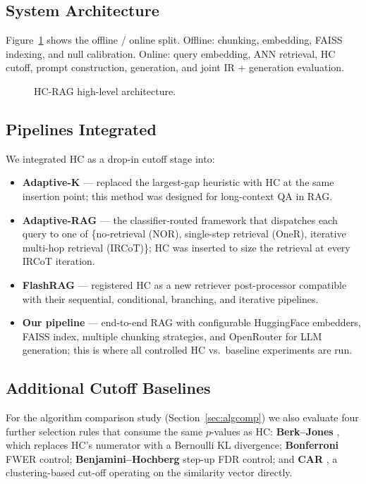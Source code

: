 \documentclass[letterpaper]{article}
\begin{document}
\subsection{System Architecture}
Figure~\ref{fig:arch} shows the offline / online split. Offline:
chunking, embedding, FAISS indexing, and null calibration. Online:
query embedding, ANN retrieval, HC cutoff, prompt construction,
generation, and joint IR + generation evaluation.

\begin{figure}[t]
\centering
\caption{HC-RAG high-level architecture.}
\label{fig:arch}
\end{figure}

\subsection{Pipelines Integrated}
We integrated HC as a drop-in cutoff stage into:
\begin{itemize}
\item \textbf{Adaptive-K} \cite{adaptivek2025} --- replaced the
largest-gap heuristic with HC at the same insertion point;
this method was designed for long-context QA in RAG.
\item \textbf{Adaptive-RAG} \cite{jeong2024adaptiverag} --- the
classifier-routed framework that dispatches each query to one of
\{no-retrieval (NOR), single-step retrieval (OneR), iterative
multi-hop retrieval (IRCoT)\}; HC was inserted to size the
retrieval at every IRCoT iteration.
\item \textbf{FlashRAG} \cite{jin2025flashrag} --- registered HC as a
new retriever post-processor compatible with their sequential,
conditional, branching, and iterative pipelines.
\item \textbf{Our pipeline} --- end-to-end RAG with configurable
HuggingFace embedders, FAISS index, multiple chunking strategies, and
OpenRouter for LLM generation; this is where all controlled HC vs.\
baseline experiments are run.
\end{itemize}

\subsection{Additional Cutoff Baselines}
For the algorithm comparison study (Section~\ref{sec:algcomp}) we
also evaluate four further selection rules that consume the same
$p$-values as HC: \textbf{Berk--Jones} \cite{berkjones1979}, which
replaces HC's numerator with a Bernoulli KL divergence;
\textbf{Bonferroni} \cite{bonferroni1961dunn} FWER control;
\textbf{Benjamini--Hochberg} \cite{benjamini1995fdr} step-up FDR
control; and \textbf{CAR} \cite{xu2025car}, a clustering-based
cut-off operating on the similarity vector directly.
\end{document}
